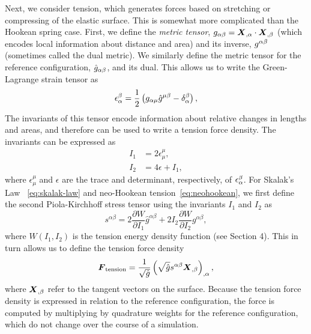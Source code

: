 Next, we consider tension, which generates forces based on stretching or compressing of the elastic surface. This is somewhat more complicated than the Hookean spring case. First, we define the \emph{metric
tensor}, $g_{\alpha\beta} = \boldsymbol{X}_{,\alpha}\cdot\boldsymbol{X}_{,\beta}$  (which encodes local
information about distance and area) and its inverse, $g^{\alpha\beta}$ (sometimes called the dual metric). We similarly define the metric tensor for the reference
configuration, $\hat{g}_{\alpha\beta}$, and its dual. This allows us to write the Green-Lagrange strain tensor as
\begin{equation}
    \epsilon_\alpha^\beta = \frac12\left(g_{\alpha\mu}\hat{g}^{\mu\beta}-\delta_\alpha^\beta\right),
\end{equation}
The invariants of this tensor encode information about relative changes in lengths and areas, and therefore can be used to write a tension force density. The invariants can be expressed as
\begin{align}
I_1 &= 2\epsilon_\mu^\mu, \\ 
I_2 &= 4\epsilon + I_1,
\end{align}
where $\epsilon_\mu^\mu$ and $\epsilon$ are the trace and determinant, respectively, of $\epsilon_\alpha^{\smash\beta}$. For Skalak's Law~%
\eqref{eq:skalak-law} and neo-Hookean tension~\eqref{eq:neohookean}, we first define the second Piola-Kirchhoff stress tensor using the invariants $I_1$ and $I_2$ as
\begin{equation}
s^{\alpha\beta} = 2\frac{\partial W}{\partial I_1} \hat{g}^{\alpha\beta} + 2I_2\frac{\partial W}{\partial I_2} g^{\alpha\beta},
\end{equation}
where $W(I_1,I_2)$ is the tension energy density function (see Section 4). This in turn allows us to define the tension force density~\cite{Maxian:2018ek}
\begin{equation}\label{eq:tension-force}
    \boldsymbol{F}_\text{tension} = \frac{1}{\sqrt{\hat{g}}}\left(\sqrt{\hat{g}}s^{\alpha\beta}\boldsymbol{X}_{,\beta}\right)_{,\alpha},
\end{equation}
where $\boldsymbol{X}_{,\beta}$ refer to the tangent vectors on the surface. Because the tension force density is expressed in relation to the reference
configuration, the force is computed by multiplying by quadrature weights for the
reference configuration, which do not change over the course of a simulation.

